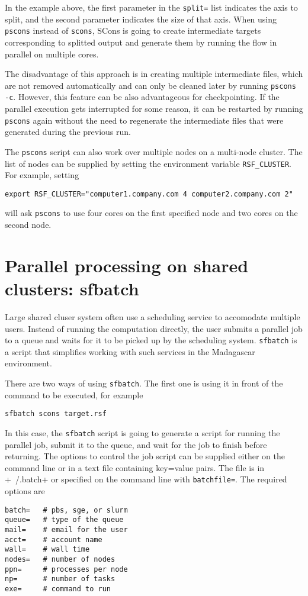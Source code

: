 In the example above, the first parameter in the \texttt{split=} list indicates the axis to
split, and the second parameter indicates the size of that axis. When
using \texttt{pscons} instead of \texttt{scons}, SCons is going to
create intermediate targets corresponding to splitted output and
generate them by running the flow in parallel on multiple cores.

The disadvantage of this approach is in creating multiple intermediate
files, which are not removed automatically and can only be cleaned
later by running \texttt{pscons -c}. However, this feature can be also
advantageous for checkpointing. If the parallel execution gets
interrupted for some reason, it can be restarted by running
\texttt{pscons} again without the need to regenerate the intermediate
files that were generated during the previous run.

The \texttt{pscons} script can also work over multiple nodes on a
multi-node cluster. The list of nodes can be supplied by setting the
environment variable \texttt{RSF\_CLUSTER}. For example, setting
\begin{verbatim}
export RSF_CLUSTER="computer1.company.com 4 computer2.company.com 2"
\end{verbatim}
will ask \texttt{pscons} to use four cores on the first specified node and two cores on the second node.

\section{Parallel processing on shared clusters: sfbatch}

Large shared cluser system often use a scheduling service to
accomodate multiple users. Instead of running the computation
directly, the user submits a parallel job to a queue and waits for it
to be picked up by the scheduling system. \texttt{sfbatch} is a script
that simplifies working with such services in the Madagascar
environment.

There are two ways of using \texttt{sfbatch}. The first one is using
it in front of the command to be executed, for example
\begin{verbatim}
sfbatch scons target.rsf
\end{verbatim}
In this case, the \texttt{sfbatch} script is going to generate a
script for running the parallel job, submit it to the queue, and wait
for the job to finish before returning. The options to control the job
script can be supplied either on the command line or in a text file
containing key=value pairs. The file is in \verbatim+~/.batch+ or 
specified on the command line with \texttt{batchfile=}.
The required options are
\begin{verbatim}
batch=   # pbs, sge, or slurm
queue=   # type of the queue
mail=    # email for the user
acct=    # account name
wall=    # wall time
nodes=   # number of nodes
ppn=     # processes per node
np=      # number of tasks
exe=     # command to run
\end{verbatim}

